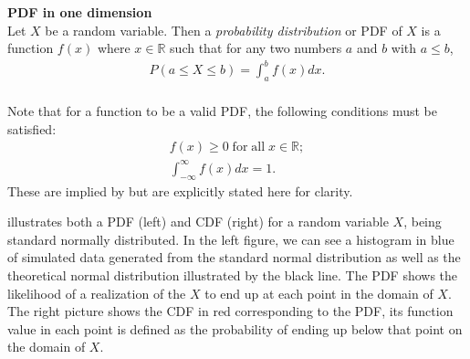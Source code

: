 \begin{definition}\label{def:PDF1d} \textbf{PDF in one dimension} \\
    Let $X$ be a random variable. Then a \emph{probability distribution} or \gls{PDF} of $X$ is a function $f(x)$ where $x \in \mathbb{R}$ such that for any two numbers $a$ and $b$ with $a \leq b$,
        \begin{align*}
            P(a \leq X \leq b) = \int_a^bf(x)dx.\\
        \end{align*}
\end{definition}
\begin{remark}\label{rem:pdfProperties}
    Note that for a function to be a valid \gls{PDF}, the following conditions must be satisfied: 
    \begin{align*}
        f(x) \geq 0 \; \mathrm{ for\; all \;} x \in \mathbb{R};\\
        \int_{-\infty}^{\infty}f(x)dx = 1. 
    \end{align*}
    These are implied by  but are explicitly stated here for clarity. 
\end{remark}


 illustrates both a \gls{PDF} (left) and \gls{CDF} (right) for a random variable $X$, being standard normally distributed. In the left figure, we can see a histogram in blue of simulated data generated from the standard normal distribution as well as the theoretical normal distribution illustrated by the black line. The \gls{PDF} shows the likelihood of a realization of the $X$ to end up at each point in the domain of $X$. The right picture shows the \gls{CDF} in red corresponding to the \gls{PDF}, its function value in each point is defined as the probability of ending up below that point on the domain of $X$.

